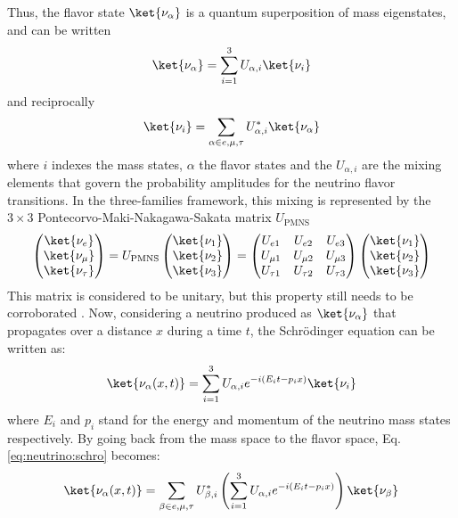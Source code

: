 \documentclass[../main.tex]{subfiles}
\begin{document}
Thus, the flavor state $\ket{\nu_\alpha}$ is a quantum superposition of mass eigenstates, and can be written
\begin{equation}
  \ket{\nu_\alpha} = \sum_{i=1}^3 U_{\alpha, i} \ket{\nu_i}
\end{equation}
and reciprocally
\begin{equation}
  \ket{\nu_i} = \sum_{\alpha \in e,\mu,\tau} U^*_{\alpha, i} \ket{\nu_\alpha}
\end{equation}
where $i$ indexes the mass states, $\alpha$ the flavor states and the $U_{\alpha, i}$ are the mixing elements that govern the probability amplitudes for the neutrino flavor transitions. In the three-families framework, this mixing is represented by the $3 \times 3$ Pontecorvo-Maki-Nakagawa-Sakata matrix \cite{maki_remarks_1962} $U_{\text{PMNS}}$
\begin{equation}
  \begin{pmatrix}
    \ket{\nu_e} \\
    \ket{\nu_\mu} \\
    \ket{\nu_\tau}
  \end{pmatrix} = U_{\text{PMNS}} \begin{pmatrix}
    \ket{\nu_1} \\
    \ket{\nu_2} \\
    \ket{\nu_3}
  \end{pmatrix} = \begin{pmatrix}
  U_{e1} & U_{e2} & U_{e3} \\
  U_{\mu 1} & U_{\mu 2} & U_{\mu 3} \\
  U_{\tau 1} & U_{\tau 2} & U_{\tau 3}
  \end{pmatrix} \begin{pmatrix}
    \ket{\nu_1} \\
    \ket{\nu_2} \\
    \ket{\nu_3}
  \end{pmatrix}
\end{equation}
This matrix is considered to be unitary, but this property still needs to be corroborated \cite{parke_unitarity_2016}. Now, considering a neutrino produced as $\ket{\nu_\alpha}$ that propagates over a distance $x$ during a time $t$, the Schrödinger equation \cite{schrodinger_undulatory_1926} can be written as:
\begin{equation}
  \label{eq:neutrino:schro}
  \ket{\nu_\alpha(x, t)} = \sum_{i=1}^3 U_{\alpha, i} e^{-i(E_it-p_ix)} \ket{\nu_i}
\end{equation}
where $E_i$ and $p_i$ stand for the energy and momentum of the neutrino mass states respectively. By going back from the mass space to the flavor space, Eq. \ref{eq:neutrino:schro} becomes:
\begin{equation}
  \ket{\nu_\alpha(x, t)} = \sum_{\beta \in e,\mu,\tau} U^*_{\beta, i} \left( \sum_{i=1}^3 U_{\alpha, i} e^{-i(E_it-p_ix)} \right) \ket{\nu_\beta}
\end{equation}
\end{document}
